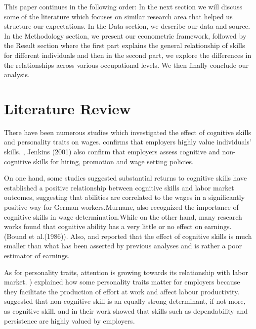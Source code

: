 \documentclass[11pt, a4paper, leqno]{article}
\begin{document}
This paper continues in the following order: In the next section we will discuss some of the literature which focuses on similar research area that helped us structure our expectations. In the Data section, we describe our data and source. In the Methodology section, we present our econometric framework, followed by the Result section where the first part explains the general relationship of skills for different individuals and then in the second part, we explore the differences in the relationships across various occupational levels. We then finally conclude our analysis.

\section*{Literature Review}

There have been numerous studies which investigated the effect of cognitive skills and personality traits on wages.\citet{heineck} confirms that employers highly value individuals’ skills. \citet{farkas}, Jenkins (2001) also confirm that employers assess cognitive and non-cognitive skills for hiring, promotion and wage setting policies.\par

On one hand, some studies suggested substantial returns to cognitive skills \citet{heineck} have established a positive relationship between cognitive skills and labor market outcomes, suggesting that abilities are correlated to the
wages in a significantly positive way for German workers.Murnane, \citet{levy} also recognized the importance of cognitive skills in wage determination.While on the other hand, many research works found that cognitive ability has a very little  or no effect on earnings.(Bound et al.(1986)). Also, \citet{heckman} and  \citet{zax} reported that the effect of cognitive skills is much smaller than what has been asserted by previous analyses and is rather a poor estimator of earnings.\par

As for personality traits, attention is growing towards its relationship with labor market. \citet{Osbornw}) explained how some personality traits matter for employers because they facilitate the production of effort at work and affect labour productivity. 
\citet{Urzua} suggested that non-cognitive skill is an equally strong determinant, if not more, as cognitive skill. \citet{Gintis} and \citet{Edwards} in their work showed that skills such as dependability and persistence are highly valued by employers.\par
\end{document}
